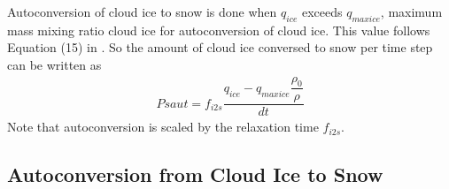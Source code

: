 \documentclass[letterpaper,titlepage,10pt]{article}
\numberwithin{equation}{section}
\begin{document}
Autoconversion of cloud ice to snow is done when $q_{ice}$ exceeds $q_{maxice}$, maximum mass mixing ratio cloud ice for autoconversion of cloud ice. This value follows Equation (15) in \citet{hong2004arev}. So the amount of cloud ice conversed to snow per time step can be written as
\begin{gather}
	Psaut = f_{i2s} \dfrac{q_{ice} - q_{maxice} \dfrac{\rho_0}{\rho}}{dt}
\end{gather}
Note that autoconversion is scaled by the relaxation time $f_{i2s}$.


\subsection{Autoconversion from Cloud Ice to Snow}
\end{document}
